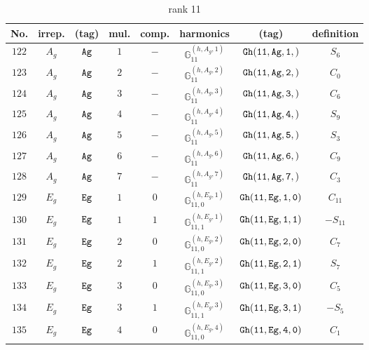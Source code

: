 \documentclass[fleqn,8pt]{jsarticle}
\begin{document}
\begin{table}[ht!]
\begin{center}
\caption{rank 11}
\renewcommand{\arraystretch}{1.3}
\begin{tabular}{cccccccc} \hline \hline
No. & irrep. & (tag) & mul. & comp. & harmonics & (tag) & definition \\ \hline
$ 122 $ & $ A_{g} $ & $ {\tt Ag} $ & $ 1 $ & $ - $ & $ \mathbb{G}_{11}^{(h,A_{g},1)} $ & $ {\tt Gh(11,Ag,1,)} $ & $ S_{6} $ \\
$ 123 $ & $ A_{g} $ & $ {\tt Ag} $ & $ 2 $ & $ - $ & $ \mathbb{G}_{11}^{(h,A_{g},2)} $ & $ {\tt Gh(11,Ag,2,)} $ & $ C_{0} $ \\
$ 124 $ & $ A_{g} $ & $ {\tt Ag} $ & $ 3 $ & $ - $ & $ \mathbb{G}_{11}^{(h,A_{g},3)} $ & $ {\tt Gh(11,Ag,3,)} $ & $ C_{6} $ \\
$ 125 $ & $ A_{g} $ & $ {\tt Ag} $ & $ 4 $ & $ - $ & $ \mathbb{G}_{11}^{(h,A_{g},4)} $ & $ {\tt Gh(11,Ag,4,)} $ & $ S_{9} $ \\
$ 126 $ & $ A_{g} $ & $ {\tt Ag} $ & $ 5 $ & $ - $ & $ \mathbb{G}_{11}^{(h,A_{g},5)} $ & $ {\tt Gh(11,Ag,5,)} $ & $ S_{3} $ \\
$ 127 $ & $ A_{g} $ & $ {\tt Ag} $ & $ 6 $ & $ - $ & $ \mathbb{G}_{11}^{(h,A_{g},6)} $ & $ {\tt Gh(11,Ag,6,)} $ & $ C_{9} $ \\
$ 128 $ & $ A_{g} $ & $ {\tt Ag} $ & $ 7 $ & $ - $ & $ \mathbb{G}_{11}^{(h,A_{g},7)} $ & $ {\tt Gh(11,Ag,7,)} $ & $ C_{3} $ \\
$ 129 $ & $ E_{g} $ & $ {\tt Eg} $ & $ 1 $ & $ 0 $ & $ \mathbb{G}_{11,0}^{(h,E_{g},1)} $ & $ {\tt Gh(11,Eg,1,0)} $ & $ C_{11} $ \\
$ 130 $ & $ E_{g} $ & $ {\tt Eg} $ & $ 1 $ & $ 1 $ & $ \mathbb{G}_{11,1}^{(h,E_{g},1)} $ & $ {\tt Gh(11,Eg,1,1)} $ & $ - S_{11} $ \\
$ 131 $ & $ E_{g} $ & $ {\tt Eg} $ & $ 2 $ & $ 0 $ & $ \mathbb{G}_{11,0}^{(h,E_{g},2)} $ & $ {\tt Gh(11,Eg,2,0)} $ & $ C_{7} $ \\
$ 132 $ & $ E_{g} $ & $ {\tt Eg} $ & $ 2 $ & $ 1 $ & $ \mathbb{G}_{11,1}^{(h,E_{g},2)} $ & $ {\tt Gh(11,Eg,2,1)} $ & $ S_{7} $ \\
$ 133 $ & $ E_{g} $ & $ {\tt Eg} $ & $ 3 $ & $ 0 $ & $ \mathbb{G}_{11,0}^{(h,E_{g},3)} $ & $ {\tt Gh(11,Eg,3,0)} $ & $ C_{5} $ \\
$ 134 $ & $ E_{g} $ & $ {\tt Eg} $ & $ 3 $ & $ 1 $ & $ \mathbb{G}_{11,1}^{(h,E_{g},3)} $ & $ {\tt Gh(11,Eg,3,1)} $ & $ - S_{5} $ \\
$ 135 $ & $ E_{g} $ & $ {\tt Eg} $ & $ 4 $ & $ 0 $ & $ \mathbb{G}_{11,0}^{(h,E_{g},4)} $ & $ {\tt Gh(11,Eg,4,0)} $ & $ C_{1} $ \\

\end{tabular}
\end{center}
\end{table}
\end{document}
